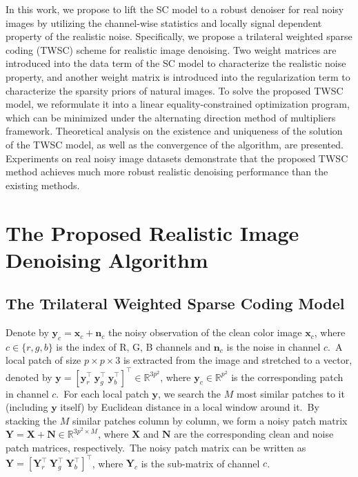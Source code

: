 In this work, we propose to lift the SC model to a robust denoiser for real noisy images by utilizing the channel-wise statistics and locally signal dependent property of the realistic noise. Specifically, we propose a trilateral weighted sparse coding (TWSC) scheme for realistic image denoising. Two weight matrices are introduced into the data term of the SC model to characterize the realistic noise property, and another weight matrix is introduced into the regularization term to characterize the sparsity priors of natural images. To solve the proposed TWSC model, we reformulate it into a linear equality-constrained optimization program, which can be minimized under the alternating direction method of multipliers \cite{admm} framework. Theoretical analysis on the existence and uniqueness of the solution of the TWSC model, as well as the convergence of the algorithm, are presented. Experiments on real noisy image datasets demonstrate that the proposed TWSC method achieves much more robust realistic denoising performance than the existing methods.





\section{The Proposed Realistic Image Denoising Algorithm}

\subsection{The Trilateral Weighted Sparse Coding Model}

Denote by $\bm{y}_{c}=\bm{x}_{c}+\bm{n}_{c}$ the noisy observation of the clean color image $\bm{x}_{c}$, where $c\in\{r, g, b\}$ is the index of R, G, B channels and $\bm{n}_{c}$ is the noise in channel $c$.\ A local patch of size $p\times p \times 3$ is extracted from the image and stretched to a vector, denoted by $\bm{y}=[\bm{y}_{r}^{\top}\ \bm{y}_{g}^{\top}\ \bm{y}_{b}^{\top}]^{\top}\in\mathbb{R}^{3p^{2}}$, where $\bm{y}_{c}\in\mathbb{R}^{p^{2}}$ is the corresponding patch in channel $c$.\ For each local patch $\bm{y}$, we search the $M$ most similar patches to it (including $\bm{y}$ itself) by Euclidean distance in a local window around it.\ By stacking the $M$ similar patches column by column, we form a noisy patch matrix $\bm{Y}=\bm{X}+\bm{N}\in\mathbb{R}^{3p^{2}\times M}$, where $\bm{X}$ and $\bm{N}$ are the corresponding clean and noise patch matrices, respectively.\ The noisy patch matrix can be written as $\bm{Y}=[\bm{Y}_{r}^{\top}\ \bm{Y}_{g}^{\top}\ \bm{Y}_{b}^{\top}]^{\top}$, where $\bm{Y}_{c}$ is the sub-matrix of channel $c$.\ 

